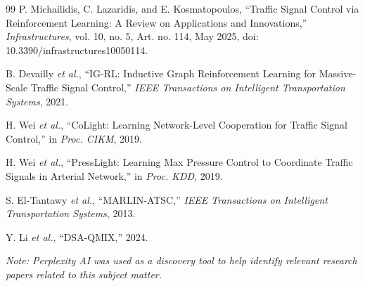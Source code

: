 \documentclass[10pt,twocolumn]{article}
\begin{document}
\begin{thebibliography}{99}
P. Michailidis, C. Lazaridis, and E. Kosmatopoulos, ``Traffic Signal Control via Reinforcement Learning: A Review on Applications and Innovations,'' \textit{Infrastructures}, vol. 10, no. 5, Art. no. 114, May 2025, doi: 10.3390/infrastructures10050114.

B. Devailly \textit{et al.}, ``IG-RL: Inductive Graph Reinforcement Learning for Massive-Scale Traffic Signal Control,'' \textit{IEEE Transactions on Intelligent Transportation Systems}, 2021.

H. Wei \textit{et al.}, ``CoLight: Learning Network-Level Cooperation for Traffic Signal Control,'' in \textit{Proc. CIKM}, 2019.

H. Wei \textit{et al.}, ``PressLight: Learning Max Pressure Control to Coordinate Traffic Signals in Arterial Network,'' in \textit{Proc. KDD}, 2019.

S. El-Tantawy \textit{et al.}, ``MARLIN-ATSC,'' \textit{IEEE Transactions on Intelligent Transportation Systems}, 2013.

Y. Li \textit{et al.}, ``DSA-QMIX,'' 2024.

\end{thebibliography}

\vspace{0.5em}
\noindent\textit{Note: Perplexity AI was used as a discovery tool to help identify relevant research papers related to this subject matter.}
\end{document}
